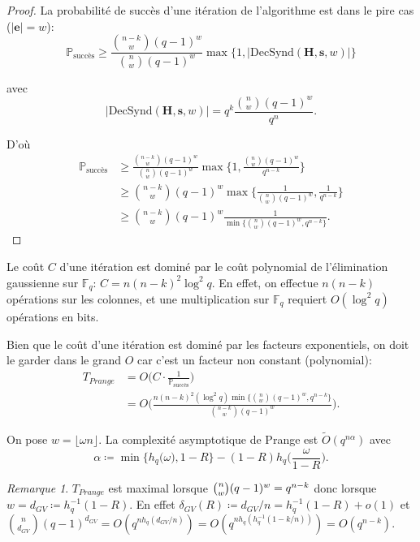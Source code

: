 \documentclass{scrartcl}[a4paper,9pt,headings=small,footinclude=false]
\theoremstyle{definition}
\theoremstyle{remark}
\newtheorem*{remark}{Remarque}
\begin{document}
\begin{proof}
La probabilité de succès d'une itération de l'algorithme est dans le pire cas ($|\textbf{e}|=w$):
\[ \mathbb{P}_{\text{succès}} \geq \frac{\binom{n-k}{w}(q-1)^w}{\binom{n}{w}(q-1)^w} \max \{1, |\text{DecSynd}(\textbf{H},\textbf{s},w)|\}\]

avec 
\[ |\text{DecSynd}(\textbf{H},\textbf{s},w)| = q^k \frac{\binom{n}{w}(q-1)^w}{q^n}. \]

D'où
\begin{align*}
    \mathbb{P}_{\text{succès}} &\geq \frac{\binom{n-k}{w}(q-1)^w}{\binom{n}{w}(q-1)^w} \max \Big\{1,\frac{\binom{n}{w}(q-1)^w}{q^{n-k}}\Big\}\\
    &\geq \binom{n-k}{w}(q-1)^w \max \Big\{\frac{1}{\binom{n}{w}(q-1)^w},\frac{1}{q^{n-k}}\Big\}\\
    &\geq \binom{n-k}{w}(q-1)^w \frac{1}{\min \{\binom{n}{w}(q-1)^w,q^{n-k}\}}.
\end{align*}
\end{proof}

Le coût $C$ d'une itération est dominé par le coût polynomial de l'élimination gaussienne sur $\mathbb{F}_q$: $C=n(n-k)^2\log^2 q$. En effet, on effectue $n(n-k)$ opérations sur les colonnes, et une multiplication sur $\mathbb{F}_q$ requiert $O(\log^2 q)$ opérations en bits.

Bien que le coût d'une itération est dominé par les facteurs exponentiels, on doit le garder dans le grand $O$ car c'est un facteur non constant (polynomial):
\begin{align*}
    T_{Prange} &= O\Big(C \cdot \frac{1}{\mathbb{P}_{\text{succès}}}\Big)\\
&= O\Bigg(\frac{n(n-k)^2(\log^2 q)\min \big\{\binom{n}{w}(q-1)^w,q^{n-k}\big\}}{\binom{n-k}{w}(q-1)^w} \Bigg).
\end{align*}

On pose $w=\lfloor \omega n \rfloor$.
La complexité asymptotique de Prange est $\tilde{O}(q^{n\alpha})$
avec \[\alpha\coloneq \min\big\{ h_q\big(\omega\big), 1-R \big\} - ( 1-R)h_q\bigg(\frac{\omega}{1-R}\bigg).\]

\begin{remark}
$T_{Prange}$ est maximal lorsque $\tbinom{n}{w}(q-1)^w=q^{n-k}$ donc lorsque $w=d_{GV}\coloneq h_q^{-1}(1-R)$. En effet $\delta_{GV}(R)\coloneq d_{GV}/n=h_q^{-1}(1-R)+o(1)$ et $\binom{n}{d_{GV}}(q-1)^{d_{GV}}=O(q^{nh_q(d_{GV}/n)})=O(q^{nh_q(h_q^{-1}(1-k/n))})=O(q^{n-k})$. %
\end{remark}
\end{document}
